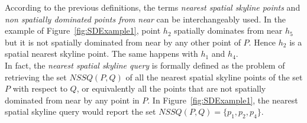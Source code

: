 \documentclass[11pt,onecolumn]{elsart3p}
\begin{document}
 According to the previous definitions, the terms {\it nearest spatial skyline points} and {\it non spatially dominated points from near } can be interchangeably used. In the example of Figure~\ref{fig:SDExample1}, point $h_2$ spatially dominates from near $h_5$ but it is not spatially dominated from near by any other point of $P$. Hence $h_2$ is a spatial nearest skyline point. The same happens with $h_1$ and $h_4$.\\

        In fact, the {\it nearest spatial skyline query} is formally defined as the problem of retrieving the set $NSSQ(P,Q)$ of all the nearest spatial skyline points of the set $P$  with respect to $Q$, or equivalently all the points that are not spatially dominated from near by any point in $P$. In Figure~\ref{fig:SDExample1}, the nearest spatial skyline query would report the set $NSSQ(P,Q) = \{p_1, p_2, p_4\}$.\\
\end{document}
